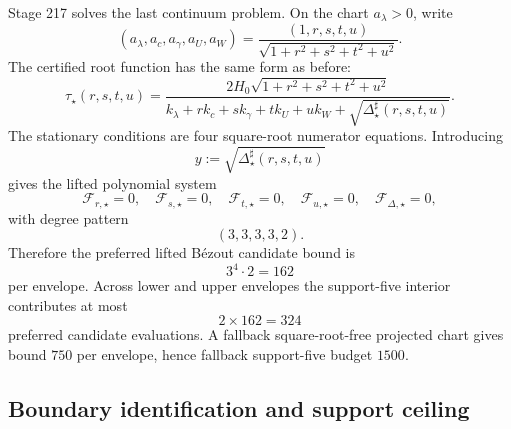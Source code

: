 Stage 217 solves the last continuum problem.  On the chart \(a_\lambda>0\), write
\begin{equation}
\label{eq:app-part06-five-ratio-coords}
(a_\lambda,a_c,a_\gamma,a_U,a_W)
=
\frac{(1,r,s,t,u)}{\sqrt{1+r^2+s^2+t^2+u^2}}.
\end{equation}
The certified root function has the same form as before:
\begin{equation}
\label{eq:app-part06-five-root}
\tau_\star(r,s,t,u)
=
\frac{2H_0\sqrt{1+r^2+s^2+t^2+u^2}}
{k_\lambda+rk_c+sk_\gamma+tk_U+uk_W+\sqrt{\Delta_\star^\sharp(r,s,t,u)}}.
\end{equation}
The stationary conditions are four square-root numerator equations.  Introducing
\begin{equation}
\label{eq:app-part06-five-y-def}
y:=\sqrt{\Delta_\star^\sharp(r,s,t,u)}
\end{equation}
gives the lifted polynomial system
\begin{equation}
\label{eq:app-part06-five-lifted-system}
\mathcal F_{r,\star}=0,
\quad
\mathcal F_{s,\star}=0,
\quad
\mathcal F_{t,\star}=0,
\quad
\mathcal F_{u,\star}=0,
\quad
\mathcal F_{\Delta,\star}=0,
\end{equation}
with degree pattern
\begin{equation}
\label{eq:app-part06-five-degree-pattern}
(3,3,3,3,2).
\end{equation}
Therefore the preferred lifted B\'ezout candidate bound is
\begin{equation}
\label{eq:app-part06-five-bezout}
3^4\cdot2=162
\end{equation}
per envelope.  Across lower and upper envelopes the support-five interior contributes at most
\begin{equation}
\label{eq:app-part06-five-budget}
2\times162=324
\end{equation}
preferred candidate evaluations.  A fallback square-root-free projected chart gives bound \(750\) per envelope, hence fallback support-five budget \(1500\).

\subsection{Boundary identification and support ceiling}
\label{subsec:app-part06-boundary-identification-support-ceiling}


